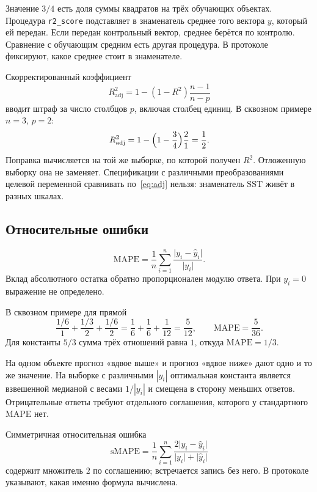 \documentclass[11pt,a4paper]{article}
\begin{document}
\begin{warnbox}
Значение \(3/4\) есть доля суммы квадратов на трёх обучающих объектах. Процедура \texttt{r2\_score} подставляет в знаменатель среднее того вектора \(y\), который ей передан. Если передан контрольный вектор, среднее берётся по контролю. Сравнение с обучающим средним есть другая процедура. В протоколе фиксируют, какое среднее стоит в знаменателе.
\end{warnbox}

Скорректированный коэффициент
\begin{equation}
\label{eq:adj}
R^{2}_{\mathrm{adj}}=1-(1-R^{2})\frac{n-1}{n-p}
\end{equation}
вводит штраф за число столбцов \(p\), включая столбец единиц. В сквозном примере \(n=3\), \(p=2\):
\[
R^{2}_{\mathrm{adj}}=1-\Bigl(1-\frac34\Bigr)\frac{2}{1}=\frac12.
\]
Поправка вычисляется на той же выборке, по которой получен \(R^{2}\). Отложенную выборку она не заменяет. Спецификации с различными преобразованиями целевой переменной сравнивать по~\eqref{eq:adj} нельзя: знаменатель \(\mathrm{SST}\) живёт в разных шкалах.

\subsection{Относительные ошибки}

\[
\mathrm{MAPE}
=\frac1n\sum_{i=1}^{n}\frac{\lvert y_i-\hat y_i\rvert}{\lvert y_i\rvert}.
\]
Вклад абсолютного остатка обратно пропорционален модулю ответа. При \(y_i=0\) выражение не определено.

В сквозном примере для прямой
\[
\frac{1/6}{1}+\frac{1/3}{2}+\frac{1/6}{2}
=\frac{1}{6}+\frac{1}{6}+\frac{1}{12}=\frac{5}{12},
\qquad
\mathrm{MAPE}=\frac{5}{36}.
\]
Для константы \(5/3\) сумма трёх отношений равна \(1\), откуда \(\mathrm{MAPE}=1/3\).

На одном объекте прогноз «вдвое выше» и прогноз «вдвое ниже» дают одно и то же значение. На выборке с различными \(|y_i|\) оптимальная константа является взвешенной медианой с весами \(1/|y_i|\) и смещена в сторону меньших ответов. Отрицательные ответы требуют отдельного соглашения, которого у стандартного MAPE нет.

Симметричная относительная ошибка
\[
\mathrm{sMAPE}
=\frac1n\sum_{i=1}^{n}
\frac{2\lvert y_i-\hat y_i\rvert}{\lvert y_i\rvert+\lvert\hat y_i\rvert}
\]
содержит множитель \(2\) по соглашению; встречается запись без него. В протоколе указывают, какая именно формула вычислена.
\end{document}
